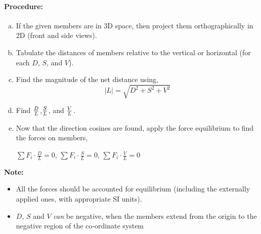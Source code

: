 \documentclass{article}
\begin{document}
{\paragraph{\Large Procedure:}
\begin{enumerate}[(a)]
\item If the given members are in 3D space, then project them orthographically in 2D (front and side views).
\item Tabulate the distances of members relative to the vertical or horizontal (for each $D$, $S$, and $V$).
\item Find the magnitude of the net distance using,
{\LARGE $$|L|=\sqrt{D^2+S^2+V^2}$$}
\item Find {\LARGE $D\over L$},{\LARGE $S\over L$}, and {\LARGE $V\over L$}.
\item Now that the direction cosines are found, apply the force equilibrium to find the forces on members,
\begin{center}
{\LARGE $\sum F_i\cdot \frac{D}L=0$}, {\LARGE $\sum F_i\cdot \frac{S}L=0$}, {\LARGE $\sum F_i\cdot \frac{V}L=0$}
\end{center}
\end{enumerate}
$\ $
\\
\textbf{\Large Note:} 
\begin{itemize}
\item All the forces should be accounted for equilibrium (including the externally applied ones, with appropriate SI units).
\item $D$, $S$ and $V$ \textit{can} be negative, when the members extend from the origin to the negative region of the co-ordinate system
\end{itemize}
\newpage
}
\end{document}
